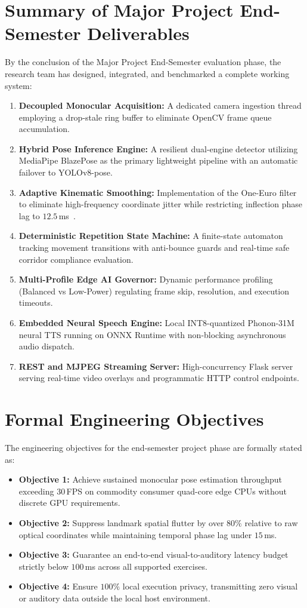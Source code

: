 \documentclass[12pt]{report}
\begin{document}
\section{Summary of Major Project End-Semester Deliverables}
By the conclusion of the Major Project End-Semester evaluation phase, the research team has designed, integrated, and benchmarked a complete working system:
\begin{enumerate}
    \item \textbf{Decoupled Monocular Acquisition:} A dedicated camera ingestion thread employing a drop-stale ring buffer to eliminate OpenCV frame queue accumulation.
    \item \textbf{Hybrid Pose Inference Engine:} A resilient dual-engine detector utilizing MediaPipe BlazePose as the primary lightweight pipeline with an automatic failover to YOLOv8-pose.
    \item \textbf{Adaptive Kinematic Smoothing:} Implementation of the One-Euro filter to eliminate high-frequency coordinate jitter while restricting inflection phase lag to $12.5$\,ms~\cite{casiez2012euro}.
    \item \textbf{Deterministic Repetition State Machine:} A finite-state automaton tracking movement transitions with anti-bounce guards and real-time safe corridor compliance evaluation.
    \item \textbf{Multi-Profile Edge AI Governor:} Dynamic performance profiling (Balanced vs Low-Power) regulating frame skip, resolution, and execution timeouts.
    \item \textbf{Embedded Neural Speech Engine:} Local INT8-quantized Phonon-31M neural TTS running on ONNX Runtime with non-blocking asynchronous audio dispatch.
    \item \textbf{REST and MJPEG Streaming Server:} High-concurrency Flask server serving real-time video overlays and programmatic HTTP control endpoints.
\end{enumerate}


\newpage
\section{Formal Engineering Objectives}
The engineering objectives for the end-semester project phase are formally stated as:
\begin{itemize}
    \item \textbf{Objective 1:} Achieve sustained monocular pose estimation throughput exceeding $30$\,FPS on commodity consumer quad-core edge CPUs without discrete GPU requirements.
    \item \textbf{Objective 2:} Suppress landmark spatial flutter by over $80\%$ relative to raw optical coordinates while maintaining temporal phase lag under $15$\,ms.
    \item \textbf{Objective 3:} Guarantee an end-to-end visual-to-auditory latency budget strictly below $100$\,ms across all supported exercises.
    \item \textbf{Objective 4:} Ensure $100\%$ local execution privacy, transmitting zero visual or auditory data outside the local host environment.
\end{itemize}
\end{document}
